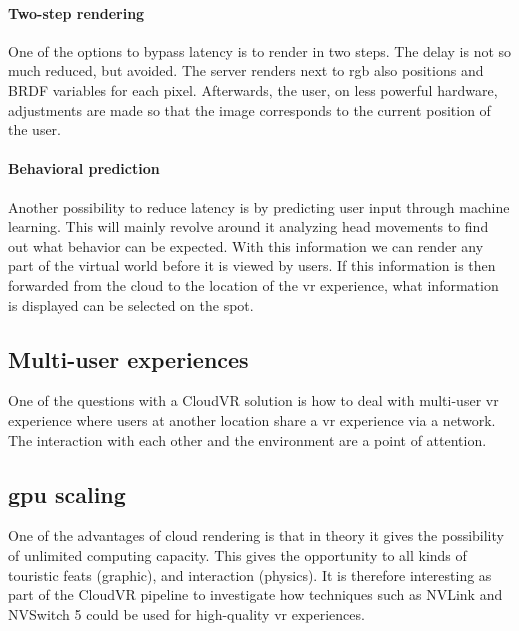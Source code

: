 \paragraph{Two-step rendering}
One of the options to bypass latency is to render in two steps.
The delay is not so much reduced, but avoided. The server renders next to
\acrshort{rgb} also positions and BRDF variables for each pixel. Afterwards, the
user, on less powerful hardware, adjustments are made so that the image
corresponds to the current position of the user.
\paragraph{Behavioral prediction}
Another possibility to reduce latency is by predicting
user input through machine learning. This will mainly revolve around it
analyzing head movements to find out what behavior can be expected. With
this information we can render any part of the virtual world before it
is viewed by users. If this information is then forwarded from the
cloud to the location of the \acrshort{vr} experience, what information is displayed can be selected on the spot.

\subsection{Multi-user experiences}
One of the questions with a CloudVR solution is how to deal with multi-user \acrshort{vr} experience where
users at another location share a \acrshort{vr} experience via a network. The interaction with
each other and the environment are a point of attention.

\subsection{\acrshort{gpu} scaling}
One of the advantages of cloud rendering is that in theory it gives the possibility of unlimited
computing capacity. This gives the opportunity to all kinds of touristic feats
(graphic), and interaction (physics). It is therefore interesting as part of the CloudVR pipeline
to investigate how techniques such as NVLink and NVSwitch 5 could be used for
high-quality \acrshort{vr} experiences.